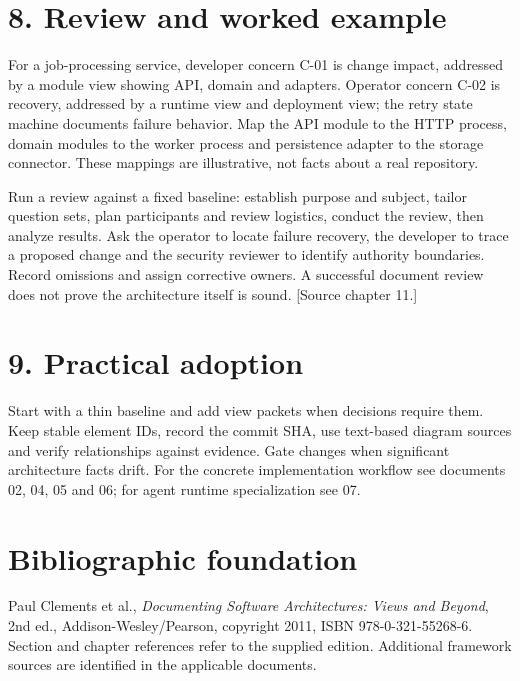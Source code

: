\documentclass[11pt,letterpaper]{article}
\begin{document}
\section*{8. Review and worked example}
For a job-processing service, developer concern C-01 is change impact, addressed by a module view showing API, domain and adapters. Operator concern C-02 is recovery, addressed by a runtime view and deployment view; the retry state machine documents failure behavior. Map the API module to the HTTP process, domain modules to the worker process and persistence adapter to the storage connector. These mappings are illustrative, not facts about a real repository.\par\smallskip
Run a review against a fixed baseline: establish purpose and subject, tailor question sets, plan participants and review logistics, conduct the review, then analyze results. Ask the operator to locate failure recovery, the developer to trace a proposed change and the security reviewer to identify authority boundaries. Record omissions and assign corrective owners. A successful document review does not prove the architecture itself is sound. [Source chapter 11.]\par\smallskip
\section*{9. Practical adoption}
Start with a thin baseline and add view packets when decisions require them. Keep stable element IDs, record the commit SHA, use text-based diagram sources and verify relationships against evidence. Gate changes when significant architecture facts drift. For the concrete implementation workflow see documents 02, 04, 05 and 06; for agent runtime specialization see 07.\par\smallskip
\section*{Bibliographic foundation}
Paul Clements et al., \emph{Documenting Software Architectures: Views and Beyond}, 2nd ed., Addison-Wesley/Pearson, copyright 2011, ISBN 978-0-321-55268-6. Section and chapter references refer to the supplied edition. Additional framework sources are identified in the applicable documents.\par
\end{document}

